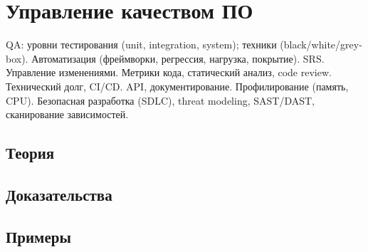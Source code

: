
\section{Управление качеством ПО}
\label{sec:2.3b.13-quality-assurance}

\begin{ticket}
QA: уровни тестирования (unit, integration, system); техники (black/white/grey-box). Автоматизация (фреймворки, регрессия, нагрузка, покрытие). SRS. Управление изменениями. Метрики кода, статический анализ, code review. Технический долг, CI/CD. API, документирование. Профилирование (память, CPU). Безопасная разработка (SDLC), threat modeling, SAST/DAST, сканирование зависимостей.
\end{ticket}

\subsection*{Теория}

\subsection*{Доказательства}

\subsection*{Примеры}
